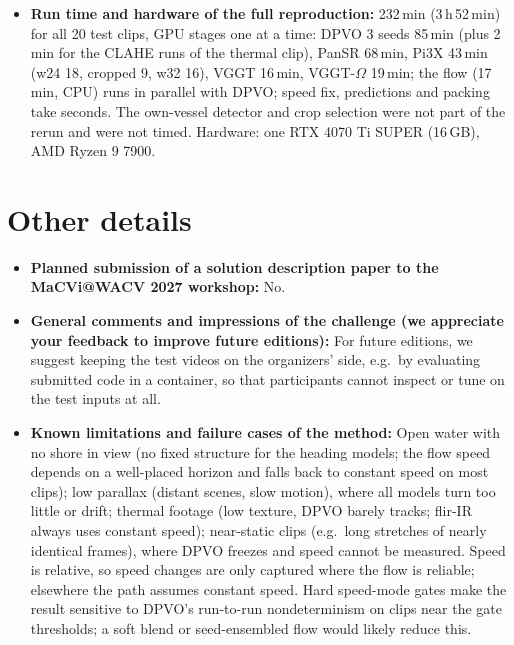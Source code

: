 \documentclass[11pt]{article}
\begin{document}
\begin{itemize}
\begin{itemize}[nosep]
        10.62\,\% for the configuration as submitted; the largest deviation (13.33\,\%) came from one clip (038) falling
        back to constant speed. Clip~072 switched to constant speed in all 6 runs.
    \end{itemize}
    The variation is concentrated in the few clips whose gate statistics lie close to a threshold. A full rerun is
    therefore expected to score within about $\pm1.5$ points of 11.02\,\% in most cases, with occasional larger
    deviations when a clip switches speed mode.
  \item \textbf{Run time and hardware of the full reproduction:} 232\,min (3\,h\,52\,min) for all 20 test
    clips, GPU stages one at a time: DPVO 3 seeds 85\,min (plus 2\,min for the CLAHE runs of the thermal clip),
    PanSR 68\,min, Pi3X 43\,min (w24 18, cropped 9, w32 16), VGGT 16\,min, VGGT-$\Omega$ 19\,min; the flow
    (17\,min, CPU) runs in parallel with DPVO; speed fix, predictions and packing take seconds. The own-vessel
    detector and crop selection were not part of the rerun and were not timed. Hardware: one RTX 4070 Ti SUPER
    (16\,GB), AMD Ryzen 9 7900.
\end{itemize}

\section{Other details}
\begin{itemize}
  \item \textbf{Planned submission of a solution description paper to the MaCVi@WACV 2027 workshop:}
    No.
  \item \textbf{General comments and impressions of the challenge (we appreciate your feedback to improve future
    editions):} For future editions, we suggest keeping the test videos on the organizers' side,
    e.g.\ by evaluating submitted code in a container, so that participants cannot inspect or tune on the test inputs
    at all.
  \item \textbf{Known limitations and failure cases of the method:} Open water with no shore in view (no fixed
    structure for the heading models; the flow speed depends on a well-placed horizon and falls back to constant
    speed on most clips); low parallax (distant scenes, slow motion), where all models turn too little or drift;
    thermal footage (low texture, DPVO barely tracks; flir-IR always uses constant speed); near-static clips
    (e.g.\ long stretches of nearly identical frames), where DPVO freezes and speed cannot be measured. Speed is
    relative, so speed changes are only captured where the flow is reliable; elsewhere the path assumes constant speed.
    Hard speed-mode gates make the result sensitive to DPVO's run-to-run nondeterminism on clips near the gate
    thresholds; a soft blend or seed-ensembled flow would likely reduce this.
\end{itemize}
\end{document}
